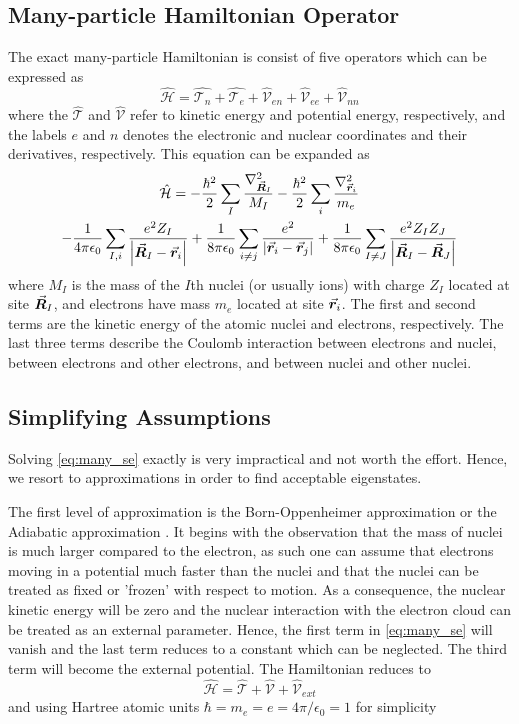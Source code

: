 \subsection{Many-particle Hamiltonian Operator}
The exact many-particle Hamiltonian is consist of five operators which can be expressed as
\begin{equation}
	\hat{\mathcal{H}} = \hat{\mathcal{T}_n} + \hat{\mathcal{T}_e} + \hat{\mathcal{V}}_{en} + \hat{\mathcal{V}}_{ee}  + \hat{\mathcal{V}}_{nn}
\end{equation}
where the $\hat{\mathcal{T}}$ and $\hat{\mathcal{V}}$ refer to kinetic energy and potential energy, respectively, and the labels $e$ and $n$ denotes the electronic and nuclear coordinates and their derivatives, respectively.  This equation can be expanded as
\begin{multline} \label{eq:many_se}
	\hat{\mathcal{H}}  = - \frac{\hbar^2}{2} \sum_I \frac{\laplacian_{\va*{R}_I}}{M_I} - \frac{\hbar^2}{2} \sum_i \frac{\laplacian_{\va*{r}_i}}{m_e} \\
	- \frac{1}{4 \pi \epsilon_0} \sum_{I,i} \frac{e^2 Z_I}{\abs{\va*{R}_I - \va*{r}_i}} + \frac{1}{8 \pi \epsilon_0} \sum_{i\neq j} \frac{e^2}{\abs{\va*{r}_i - \va*{r}_j}} + \frac{1}{8 \pi \epsilon_0} \sum_{I\neq J} \frac{e^2 Z_I Z_J}{\abs{\va*{R}_I - \va*{R}_J}}
\end{multline}
where $M_I$ is the mass of the $I$th nuclei (or usually ions) with charge $Z_I$ located at site $\va*{R}_I$, and electrons have mass $m_e$  located at site $\va*{r}_i$. The first and second terms are the kinetic energy of the atomic nuclei and electrons, respectively. The last three terms
describe the Coulomb interaction between electrons and nuclei, between electrons and other electrons, and between nuclei and other nuclei.

\subsection{Simplifying Assumptions}
Solving \eqref{eq:many_se} exactly is very impractical and not worth the effort. Hence, we resort to approximations in order to find acceptable eigenstates.

The first level of approximation is the Born-Oppenheimer approximation or the Adiabatic approximation \citep{Born1927}. It begins with the observation that the mass of nuclei is much larger compared to the electron, as such one can assume that electrons moving in a potential much faster than the nuclei and that the nuclei can be treated as fixed or 'frozen' with respect to motion. As a consequence, the nuclear kinetic energy will be zero and the nuclear interaction with the electron cloud  can be treated as an external parameter. Hence, the first  term in \eqref{eq:many_se} will vanish and the last term reduces to a constant which can be neglected. The third term will become the external potential. The Hamiltonian reduces to
\begin{equation}
	\hat{\mathcal{H}}  = \hat{\mathcal{T}} + \hat{\mathcal{V}} + \hat{\mathcal{V}}_{ext}
\end{equation}
and using Hartree atomic units $\hbar = m_e = e = 4 \pi / \epsilon_0 =1$ for simplicity

